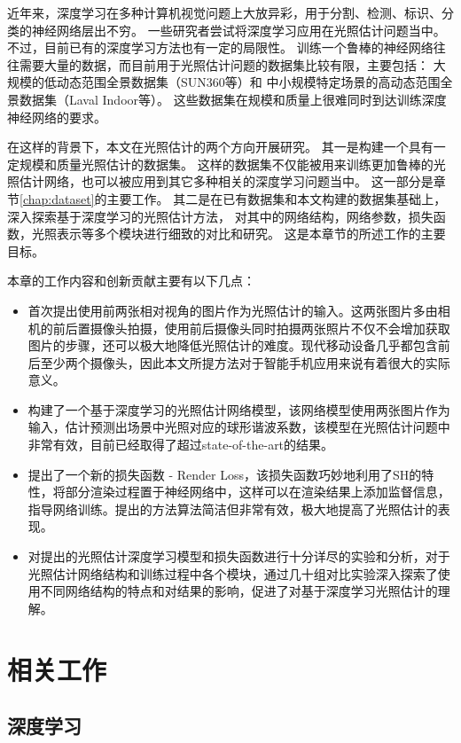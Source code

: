 近年来，深度学习在多种计算机视觉问题上大放异彩，用于分割、检测、标识、分类的神经网络层出不穷。
一些研究者尝试将深度学习应用在光照估计问题当中。
不过，目前已有的深度学习方法也有一定的局限性。
训练一个鲁棒的神经网络往往需要大量的数据，而目前用于光照估计问题的数据集比较有限，主要包括：
大规模的低动态范围全景数据集（SUN360等）和
中小规模特定场景的高动态范围全景数据集（Laval Indoor等）。
这些数据集在规模和质量上很难同时到达训练深度神经网络的要求。

在这样的背景下，本文在光照估计的两个方向开展研究。
其一是构建一个具有一定规模和质量光照估计的数据集。
这样的数据集不仅能被用来训练更加鲁棒的光照估计网络，也可以被应用到其它多种相关的深度学习问题当中。
这一部分是章节\ref{chap:dataset}的主要工作。
其二是在已有数据集和本文构建的数据集基础上，深入探索基于深度学习的光照估计方法，
对其中的网络结构，网络参数，损失函数，光照表示等多个模块进行细致的对比和研究。
这是本章节的所述工作的主要目标。

本章的工作内容和创新贡献主要有以下几点：
\begin{itemize}
    \item 首次提出使用前两张相对视角的图片作为光照估计的输入。这两张图片多由相机的前后置摄像头拍摄，使用前后摄像头同时拍摄两张照片不仅不会增加获取图片的步骤，还可以极大地降低光照估计的难度。现代移动设备几乎都包含前后至少两个摄像头，因此本文所提方法对于智能手机应用来说有着很大的实际意义。
    \item 构建了一个基于深度学习的光照估计网络模型，该网络模型使用两张图片作为输入，估计预测出场景中光照对应的球形谐波系数，该模型在光照估计问题中非常有效，目前已经取得了超过state-of-the-art的结果。
    \item 提出了一个新的损失函数 - Render Loss，该损失函数巧妙地利用了SH的特性，将部分渲染过程置于神经网络中，这样可以在渲染结果上添加监督信息，指导网络训练。提出的方法算法简洁但非常有效，极大地提高了光照估计的表现。
    \item 对提出的光照估计深度学习模型和损失函数进行十分详尽的实验和分析，对于光照估计网络结构和训练过程中各个模块，通过几十组对比实验深入探索了使用不同网络结构的特点和对结果的影响，促进了对基于深度学习光照估计的理解。
\end{itemize}

\section{相关工作}
\subsection{深度学习}
